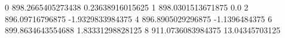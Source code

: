 0 898.2665405273438 0.23638916015625
1 898.0301513671875 0.0
2 896.09716796875 -1.9329833984375
4 896.8905029296875 -1.1396484375
6 899.8634643554688 1.83331298828125
8 911.0736083984375 13.04345703125
